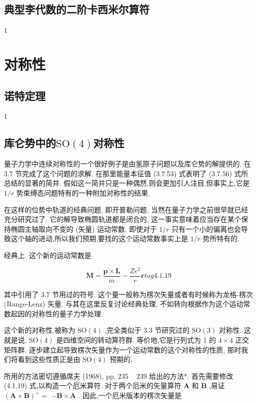 \subsection{典型李代数的二阶卡西米尔算符}
1
\section{对称性}
\subsection{诺特定理}
1
\subsection{库仑势中的$\mathrm{SO}(4)$对称性}

量子力学中连续对称性的一个很好例子是由氢原子问题以及库仑势的解提供的. 在 3.7 节完成了这个问题的求解, 在那里能量本征值 (3.7.53) 式表明了 (3.7.56) 式所总结的显著的简并. 假如这一简并只是一种偶然,则会更加引人注目,但事实上,它是 $1/r$ 势束缚态问题特有的一种附加对称性的结果.

在这样的位势中轨道的经典问题, 即开普勒问题, 当然在量子力学之前很早就已经充分研究过了. 它的解导致椭圆轨道都是闭合的, 这一事实意味着应当存在某个保持椭圆主轴取向不变的 (矢量) 运动常数. 即使对于 $1/r$ 只有一个小的偏离也会导致这个轴的进动,所以我们预期,要找的这个运动常数事实上是 $1/r$ 势所特有的.

经典上. 这个新的运动常数是

$$
\mathbf{M} = \frac{\mathbf{p} \times \mathbf{L}}{m} - \frac{Z{e}^{2}}{r}\mathbf{r} tag{4.1.19}
$$

其中引用了 3.7 节用过的符号. 这个量一般称为楞次矢量或者有时候称为龙格-楞次 (Runge-Lenz) 矢量. 与其在这里反复讨论经典处理, 不如转向根据作为这个运动常数起因的对称性的量子力学处理.

这个新的对称性,被称为 $\mathrm{{SO}}\left( 4\right)$ ,完全类似于 3.3 节研究过的 $\mathrm{{SO}}\left( 3\right)$ 对称性. 这就是说, $\mathrm{{SO}}\left( 4\right)$ 是四维空间的转动算符群. 等价地,它是行列式为 1 的 $4 \times 4$ 正交矩阵群. 逐步建立起导致楞次矢量作为一个运动常数的这个对称性的性质, 那时我们将看到这些性质正是由 $\mathrm{{SO}}\left( 4\right)$ 预期的.

所用的方法密切遵循席夫 (1968), pp. 235 ~ 239 给出的方法*. 首先需要修改 (4.1.19) 式,以构造一个厄米算符. 对于两个厄米的矢量算符 $\mathbf{A}$ 和 $\mathbf{B}$ ,易证 ${\left( \mathbf{A} \times \mathbf{B}\right) }^{ + } =$ $- \mathbf{B} \times \mathbf{A}$ . 因此,一个厄米版本的楞次矢量是

